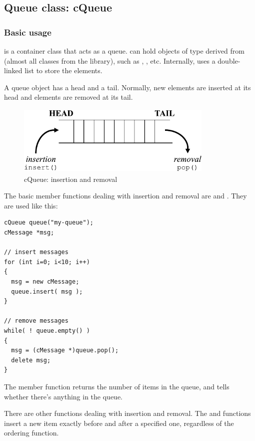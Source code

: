 \subsection{Queue class: cQueue}

\subsubsection{Basic usage}


 is a container class that acts as a queue.
 can hold objects of type derived from 
(almost all classes from the {\opp} library), such as
, , etc. Internally, 
uses a double-linked list to store the elements.

A queue object has a head and a tail. Normally, new elements
are inserted at its head and elements are removed at its tail.


\begin{figure}[htbp]
  \begin{center}
    \includegraphics[width=3.703in, height=1.303in]{figures/usmanFig10}
    \caption{cQueue: insertion and removal}
    \label{fig:ch-sim-lib:cqueue}
  \end{center}
\end{figure}

The basic  member functions dealing with insertion and removal
are  and . They are used
like this:

\begin{verbatim}
cQueue queue("my-queue");
cMessage *msg;

// insert messages
for (int i=0; i<10; i++)
{
  msg = new cMessage;
  queue.insert( msg );
}

// remove messages
while( ! queue.empty() )
{
  msg = (cMessage *)queue.pop();
  delete msg;
}
\end{verbatim}


The  member function returns the number of items in the
queue, and  tells whether there's anything in the queue.

There are other functions dealing with insertion and removal.  The
 and  functions insert a
new item exactly before and after a specified one, regardless of the
ordering function.

